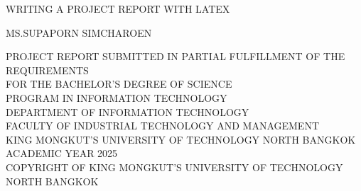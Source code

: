 \newpage
\thispagestyle{empty}
\begin{center}


WRITING A PROJECT REPORT WITH LATEX     %


\vspace{80mm}
MS.SUPAPORN SIMCHAROEN      %
\vspace{84mm}   





PROJECT REPORT SUBMITTED IN PARTIAL FULFILLMENT OF THE REQUIREMENTS\\

FOR THE BACHELOR’S DEGREE OF SCIENCE\\
PROGRAM IN INFORMATION TECHNOLOGY\\



DEPARTMENT OF INFORMATION TECHNOLOGY\\
FACULTY OF INDUSTRIAL TECHNOLOGY AND MANAGEMENT\\
KING MONGKUT’S UNIVERSITY OF TECHNOLOGY NORTH BANGKOK\\
ACADEMIC YEAR 2025\\
COPYRIGHT OF KING MONGKUT’S UNIVERSITY OF TECHNOLOGY NORTH BANGKOK

\end{center}